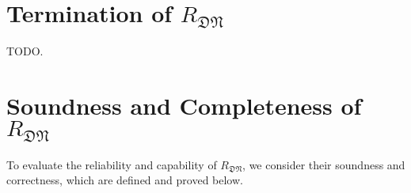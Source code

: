 \documentclass[manuscript, review, timestamp]{acmart}
\newcommand*{\fst}{\texttt{fst }}
\newcommand*{\snd}{\texttt{snd }}
\newcommand*{\reduce}{\ \triangleright\ }
\begin{document}







\section{Termination of $R_\mathfrak{DN}$}

TODO.

\section{Soundness and Completeness of $R_\mathfrak{DN}$}

To evaluate the reliability and capability of $R_\mathfrak{DN}$, we consider their soundness and correctness, which are defined and proved below.
\end{document}
